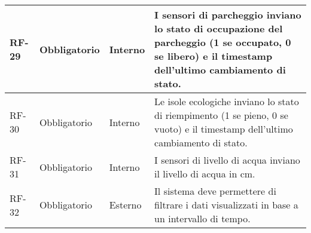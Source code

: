 \begin{longtable}{|>{\centering\arraybackslash}m{}|>{\centering\arraybackslash}m{}|>{\centering\arraybackslash}m{}|>{\centering\arraybackslash}m{}|}
	RF-29           & Obbligatorio        & Interno                                                                                                           & I sensori di parcheggio inviano lo stato di occupazione del parcheggio (1 se occupato, 0 se libero) e il timestamp dell'ultimo cambiamento di stato.                                                                                                                                                                                                                                                                                                                                                 \\\hline
	RF-30           & Obbligatorio        & Interno                                                                                                           & Le isole ecologiche inviano lo stato di riempimento (1 se pieno, 0 se vuoto) e il timestamp dell'ultimo cambiamento di stato.                                                                                                                                                                                                                                                                                                                                                                        \\\hline
	RF-31           & Obbligatorio        & Interno                                                                                                           & I sensori di livello di acqua inviano il livello di acqua in cm.                                                                                                                                                                                                                                                                                                                                                                                                                                     \\\hline
	RF-32           & Obbligatorio        & Esterno                                                                                                           & Il sistema deve permettere di filtrare i dati visualizzati in base a un intervallo di tempo.                                                                                                                                                                                                                                                                                                                                                                                                         \\\hline

\end{longtable}
